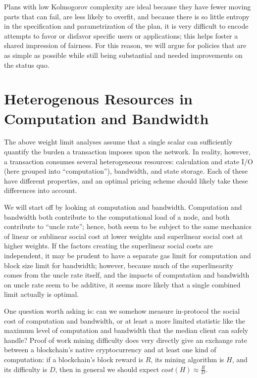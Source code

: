 \documentclass[12pt, final]{article}
\begin{document}
Plans with low Kolmogorov complexity are ideal because they have fewer moving parts that can fail, are less likely to overfit, and because there is so little entropy in the specification and parametrization of the plan, it is very difficult to encode attempts to favor or disfavor specific users or applications; this helps foster a shared impression of fairness. For this reason, we will argue for policies that are as simple as possible while still being substantial and needed improvements on the status quo.

\section{Heterogenous Resources in Computation and Bandwidth}

The above weight limit analyses assume that a single scalar can sufficiently quantify the burden a transaction imposes upon the network. In reality, however, a transaction consumes several heterogeneous resources: calculation and state I/O (here grouped into ``computation''), bandwidth, and state storage.  Each of these have different properties, and an optimal pricing scheme should likely take these differences into account.

We will start off by looking at computation and bandwidth. Computation and bandwidth both contribute to the computational load of a node, and both contribute to ``uncle rate''; hence, both seem to be subject to the same mechanics of linear or sublinear social cost at lower weights and superlinear social cost at higher weights. If the factors creating the superlinear social costs are independent, it may be prudent to have a separate gas limit for computation and block size limit for bandwidth; however, because much of the superlinearity comes from the uncle rate itself, and the impacts of computation and bandwidth on uncle rate seem to be additive, it seems more likely that a single combined limit actually is optimal.

One question worth asking is: can we somehow measure in-protocol the social cost of computation and bandwidth, or at least a more limited statistic like the maximum level of computation and bandwidth that the median client can safely handle? Proof of work mining difficulty does very directly give an exchange rate between a blockchain's native cryptocurrency and at least one kind of computation: if a blockchain's block reward is $R$, its mining algorithm is $H$, and its difficulty is $D$, then in general we should expect $cost(H) \approx \frac{R}{D}$.
\end{document}
